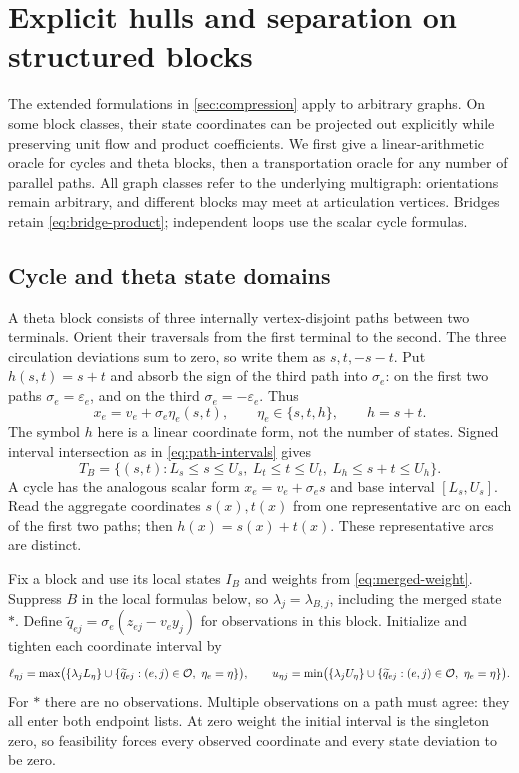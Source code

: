 \section{Explicit hulls and separation on structured blocks}\label{sec:structured-oracles}
The extended formulations in \cref{sec:compression} apply to arbitrary
graphs. On some block classes, their state coordinates can be projected
out explicitly while preserving unit flow and product coefficients. We
first give a linear-arithmetic oracle for cycles and theta blocks, then a
transportation oracle for any number of parallel paths. All graph classes
refer to the underlying multigraph: orientations remain arbitrary, and
different blocks may meet at articulation vertices. Bridges retain
\eqref{eq:bridge-product}; independent loops use the scalar cycle formulas.

\subsection{Cycle and theta state domains}\label{subsec:theta-domains}
A theta block consists of three internally vertex-disjoint paths between
two terminals. Orient their traversals from the first terminal to the
second. The three circulation deviations sum to zero, so write them as
$s,t,-s-t$. Put $h(s,t)=s+t$ and absorb the sign of the third path into
$\sigma_e$: on the first two paths $\sigma_e=\varepsilon_e$, and on the
third $\sigma_e=-\varepsilon_e$. Thus
\begin{equation}\label{eq:theta-arc-form}
 x_e=v_e+\sigma_e\eta_e(s,t),\qquad
 \eta_e\in\{s,t,h\},\qquad h=s+t.
\end{equation}
The symbol $h$ here is a linear coordinate form, not the number of states.
Signed interval intersection as in \eqref{eq:path-intervals} gives
\begin{equation}\label{eq:theta-base}
 T_B=\{(s,t):L_s\le s\le U_s,\ L_t\le t\le U_t,
                       \ L_h\le s+t\le U_h\}.
\end{equation}
A cycle has the analogous scalar form $x_e=v_e+\sigma_es$ and base
interval $[L_s,U_s]$. Read the aggregate coordinates $s(x),t(x)$ from
one representative arc on each of the first two paths; then
$h(x)=s(x)+t(x)$. These representative arcs are distinct.

Fix a block and use its local states $I_B$ and weights from
\eqref{eq:merged-weight}. Suppress $B$ in the local formulas below, so
$\lambda_j=\lambda_{B,j}$, including the merged state $*$. Define
$\widetilde q_{ej}=\sigma_e(z_{ej}-v_ey_j)$ for observations in this
block. Initialize and tighten each coordinate interval by
\begin{equation}\label{eq:theta-tightened-intervals}
 \ell_{\eta j}=\max\bigl(\{\lambda_jL_\eta\}\cup
        \{\widetilde q_{ej}:(e,j)\in\mathcal O,\ \eta_e=\eta\}\bigr),\qquad
 u_{\eta j}=\min\bigl(\{\lambda_jU_\eta\}\cup
        \{\widetilde q_{ej}:(e,j)\in\mathcal O,\ \eta_e=\eta\}\bigr).
\end{equation}
For $*$ there are no observations. Multiple observations on a path must
agree: they all enter both endpoint lists. At zero weight the initial
interval is the singleton zero, so feasibility forces every observed
coordinate and every state deviation to be zero.

